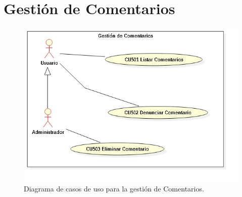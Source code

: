 \section{Gesti\'{o}n de Comentarios}

\begin{figure}[h]
\centering
\includegraphics[width=1\textwidth]{Img/CasosDeUso/DCU05.jpg}
\caption{Diagrama de casos de uso para la gesti\'{o}n de Comentarios.}
\label{fig:dcu}
\end{figure}
